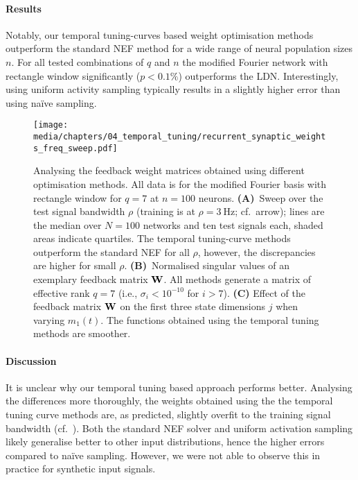 \paragraph{Results}
Notably, our temporal tuning-curves based weight optimisation methods outperform the standard NEF method for a wide range of neural population sizes $n$.
For all tested combinations of $q$ and $n$ the modified Fourier network with rectangle window significantly ($p < 0.1\%$) outperforms the LDN.
Interestingly, using uniform activity sampling typically results in a slightly higher error than using na\"ive sampling.

\begin{figure}
	\centering
	\texttt{[image: media/chapters/04\_temporal\_tuning/recurrent\_synaptic\_weights\_freq\_sweep.pdf]}%
	{\label{fig:recurrent_synaptic_weights_freq_sweep_a}}%
	{\label{fig:recurrent_synaptic_weights_freq_sweep_b}}%
	{\label{fig:recurrent_synaptic_weights_freq_sweep_c}}%
	\caption[Analysing the feedback weight matrices obtained using different optimisation methods]{Analysing the feedback weight matrices obtained using different optimisation methods.
	All data is for the modified Fourier basis with rectangle window for $q = 7$ at $n = 100$ neurons.
	\textbf{(A)}~Sweep over the test signal bandwidth $\rho$ (training is at $\rho = \SI{3}{\hertz}$; cf.~arrow); lines are the median over $N = 100$ networks and ten test signals each, shaded areas indicate quartiles.
	The temporal tuning-curve methods outperform the standard NEF for all $\rho$, however, the discrepancies are higher for small $\rho$.
	\textbf{(B)}~Normalised singular values of an exemplary feedback matrix $\mathbf{W}$. All methods generate a matrix of effective rank $q = 7$ (i.e., $\sigma_i < 10^{-10}$ for $i > 7$).
	\textbf{(C)} Effect of the feedback matrix $\mathbf{W}$ on the first three state dimensions $j$ when varying $m_1(t)$.
	The functions obtained using the temporal tuning methods are smoother.
	}
	\label{fig:recurrent_synaptic_weights_freq_sweep}
\end{figure}

\paragraph{Discussion}
It is unclear why our temporal tuning based approach performs better.
Analysing the differences more thoroughly, the weights obtained using the the temporal tuning curve methods are, as predicted, slightly overfit to the training signal bandwidth (cf.~).
Both the standard NEF solver and uniform activation sampling likely generalise better to other input distributions, hence the higher errors compared to na\"ive sampling.
However, we were not able to observe this in practice for synthetic input signals.

